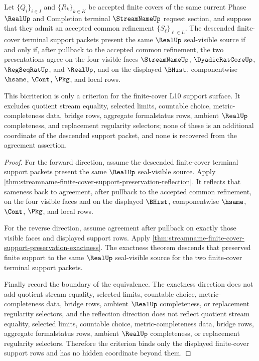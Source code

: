 \begin{theorem}
\label{thm:streamname-finite-cover-support-bicriterion}
Let $\{Q_i\}_{i \in I}$ and $\{R_k\}_{k \in K}$ be accepted finite covers of
the same current Phase $\RealUp$ and Completion terminal $\StreamNameUp$
request section, and suppose that they admit an accepted common refinement
$\{S_\ell\}_{\ell \in L}$. The descended finite-cover terminal support packets
present the same $\RealUp$ seal-visible source if and only if, after pullback
to the accepted common refinement, the two presentations agree on the four
visible faces $\StreamNameUp$, $\DyadicRatCoreUp$, $\RegSeqRatUp$, and
$\RealUp$, and on the displayed $\BHist$, componentwise $\hsame$, $\Cont$,
$\Pkg$, and local \NameCert{} rows.

This bicriterion is only a criterion for the finite-cover L10 support surface.
It excludes quotient stream equality, selected limits, countable choice,
metric-completeness data, bridge rows, aggregate formalstatus rows, ambient
$\RealUp$ completeness, and replacement regularity selectors; none of these is
an additional coordinate of the descended support packet, and none is
recovered from the agreement assertion.
\end{theorem}
\begin{proof}
For the forward direction, assume the descended finite-cover terminal support
packets present the same $\RealUp$ seal-visible source. Apply
\autoref{thm:streamname-finite-cover-support-preservation-reflection}. It
reflects that sameness back to agreement, after pullback to the accepted
common refinement, on the four visible faces and on the displayed $\BHist$,
componentwise $\hsame$, $\Cont$, $\Pkg$, and local \NameCert{} rows.

For the reverse direction, assume agreement after pullback on exactly those
visible faces and displayed support rows. Apply
\autoref{thm:streamname-finite-cover-support-preservation-exactness}. The
exactness theorem descends that preserved finite support to the same
$\RealUp$ seal-visible source for the two finite-cover terminal support
packets.

Finally record the boundary of the equivalence. The exactness direction does
not add quotient stream equality, selected limits, countable choice,
metric-completeness data, bridge rows, ambient $\RealUp$ completeness, or
replacement regularity selectors, and the reflection direction does not
reflect quotient stream equality, selected limits, countable choice,
metric-completeness data, bridge rows, aggregate formalstatus rows, ambient
$\RealUp$ completeness, or replacement regularity selectors. Therefore the
criterion binds only the displayed finite-cover support rows and has no hidden
coordinate beyond them.
\end{proof}
